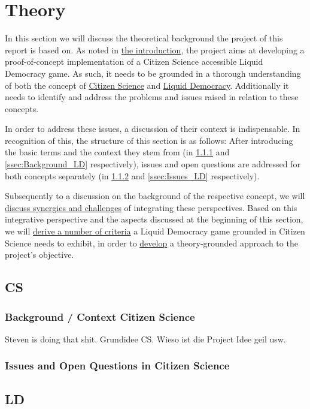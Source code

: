 \chapter{Theory}
\label{ch:Theory}

In this section we will discuss the theoretical background the project of this report is based on. As noted in \href{ssec:Objective}{the introduction}, the project aims at developing a proof-of-concept implementation of a Citizen Science accessible Liquid Democracy game. As such, it needs to be grounded in a thorough understanding of both the concept of \href{ssec:Theory_CS}{Citizen Science} and \href{ssec:Theory_LD}{Liquid Democracy}. Additionally it needs to identify and address the problems and issues raised in relation to these concepts. 

In order to address these issues, a discussion of their context is indispensable. In recognition of this, the structure of this section is as follows:
After introducing the basic terms and the context they stem from (in \ref{ssec:Background_CS} and \ref{ssec:Background_LD} respectively), issues and open questions are addressed for both concepts separately (in \ref{ssec:Issues_CS} and \ref{ssec:Issues_LD} respectively). 

Subsequently to a discussion on the background of the respective concept, we will \href{ssec:Integration_CSLD}{discuss synergies and challenges} of integrating these perspectives. Based on this integrative perspective and the aspects discussed at the beginning of this section, we will \href{ssec:Criteria}{derive a number of criteria} a Liquid Democracy game grounded in Citizen Science needs to exhibit, in order to \href{sec:Approach}{develop} a theory-grounded approach to the project's objective.
\section{CS}
\label{sec:Theory_CS}
\subsection{Background / Context Citizen Science}
\label{ssec:Background_CS}
Steven is doing that shit. Grundidee CS. Wieso ist die Project Idee geil usw.
\subsection{Issues and Open Questions in Citizen Science}
\label{ssec:Issues_CS}
\section{LD}
\label{sec:Theory_LD}
